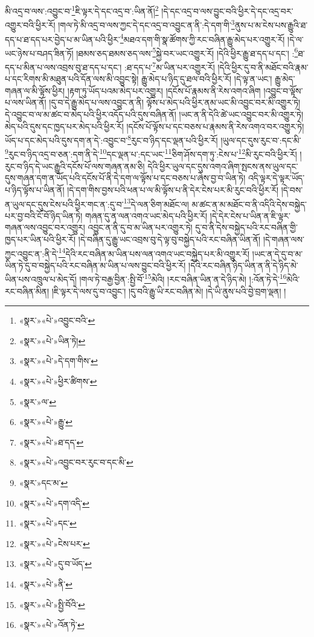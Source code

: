 མི་འདྲ་བ་ལས་:འབྱུང་བ་\footnote{«སྣར་»«པེ་»འབྱུང་བའི་}ཇི་ལྟར་དེ་དང་འདྲ་བ་:ཡིན་ནོ།\footnote{«སྣར་»«པེ་»ཡིན་ཏེ།} །དེ་དང་འདྲ་བ་ལས་བྱུང་བའི་ཕྱིར་དེ་དང་འདྲ་བར་འགྱུར་བའི་ཕྱིར་རོ། །གལ་ཏེ་མི་འདྲ་བ་ལས་ཀྱང་དེ་དང་འདྲ་བ་འབྱུང་ན་ནི་:དེ་དག་གི་\footnote{«སྣར་»«པེ་»དེ་དག་གིས་}ནུས་པ་མ་ངེས་པས་རྒྱུའི་ཐ་དད་པ་ཐ་དད་པར་བྱེད་པ་མ་ཡིན་པའི་ཕྱིར་\footnote{«སྣར་»«པེ་»ཕྱིར་ཚིགས་}མཐའ་དག་གི་སྣ་ཚོགས་ཀྱི་རང་བཞིན་རྒྱུ་མེད་པར་འགྱུར་རོ། །དེ་ལ་ཡང་ཉེས་པ་བཤད་ཟིན་ཏོ། །ཐམས་ཅད་ཐམས་ཅད་ལས་\footnote{«སྣར་»ལ་}སྐྱེ་བར་ཡང་འགྱུར་རོ། །དེའི་ཕྱིར་རྒྱུ་ཐ་དད་པ་དང་། :\footnote{«སྣར་»«པེ་»རྒྱུ་}ཐ་དད་པ་མིན་པ་ལས་འབྲས་བུ་ཐ་དད་པ་དང་། :ཐ་དད་པ་\footnote{«སྣར་»«པེ་»ཐ་དད་}མ་ཡིན་པར་འགྱུར་རོ། །དེའི་ཕྱིར་དུ་བ་ནི་མཐོང་བའི་རྣམ་པ་དང་རིགས་མི་མཐུན་པའི་དོན་ལས་མི་འབྱུང་སྟེ། རྒྱུ་མེད་པ་ཉིད་དུ་ཐལ་བའི་ཕྱིར་རོ། །དེ་ལྟ་ན་ཡང་། རྒྱུ་མེད་གཞན་ལ་མི་ལྟོས་ཕྱིར། །རྟག་ཏུ་ཡོད་པའམ་མེད་པར་འགྱུར། །དངོས་པོ་རྣམས་ནི་རེས་འགའ་ཞིག །འབྱུང་བ་ལྟོས་པ་ལས་ཡིན་ནོ། །དུ་བ་དེ་རྒྱུ་མེད་པ་ལས་འབྱུང་ན་ནི། ལྟོས་པ་མེད་པའི་ཕྱིར་ནམ་ཡང་མི་འབྱུང་བར་མི་འགྱུར་ཏེ། དེ་འབྱུང་བ་ལ་མ་ཚང་བ་མེད་པའི་ཕྱིར་འདོད་པའི་དུས་བཞིན་ནོ། །ཡང་ན་ནི་དེའི་ཚེ་ཡང་འབྱུང་བར་མི་འགྱུར་ཏེ། མེད་པའི་དུས་དང་ཁྱད་པར་མེད་པའི་ཕྱིར་རོ། །དངོས་པོ་ལྟོས་པ་དང་བཅས་པ་རྣམས་ནི་རེས་འགའ་བར་འགྱུར་ཏེ། ཡོད་པ་དང་མེད་པའི་དུས་དག་ན་དེ་:འབྱུང་བ་\footnote{«སྣར་»«པེ་»འབྱུང་བར་རུང་བ་དང་མི་}རུང་བ་ཉིད་དང་ལྡན་པའི་ཕྱིར་རོ། །ཡུལ་དང་དུས་རུང་བ་:དང་མི་\footnote{«སྣར་»དང་མ་}རུང་བ་ཉིད་འདྲ་བ་ཅན་:དག་ནི་དེ་\footnote{«སྣར་»«པེ་»དག་འདི་}དང་ལྡན་པ་:དང་ཡང་\footnote{«སྣར་»«པེ་»དང་}ཅིག་ཤོས་དག་ཏུ་:ངེས་པ་\footnote{«སྣར་»«པེ་»ངེས་པར་}མི་རུང་བའི་ཕྱིར་རོ། །རུང་བ་ཉིད་དེ་ཡང་རྒྱུའི་དངོས་པོ་ལས་གཞན་ནམ་ཅི། དེའི་ཕྱིར་ཡུལ་དང་དུས་འགའ་ཞིག་སྤངས་ནས་ཡུལ་དང་དུས་གཞན་དག་ན་ཡོད་པའི་དངོས་པོ་ནི་དེ་དག་ལ་ལྟོས་པ་དང་བཅས་པ་ཞེས་བྱ་བ་ཡིན་ཏེ། འདི་ལྟར་དེ་ལྟར་ཡོད་པ་ཉིད་ལྟོས་པ་ཡིན་ནོ། །དེ་དག་གིས་བྱས་པའི་ཕན་པ་ལ་མི་ལྟོས་པ་ནི་དེར་ངེས་པར་མི་རུང་བའི་ཕྱིར་རོ། །དེ་བས་ན་ཡུལ་དང་དུས་ངེས་པའི་ཕྱིར་གང་ན་:དུ་བ་\footnote{«སྣར་»«པེ་»དུ་བ་ཡོད་}དེ་ལན་ཅིག་མཐོང་ལ། མ་ཚང་ན་མ་མཐོང་བ་ནི་འདིའི་དེས་བསྐྱེད་པར་བྱ་བའི་ངོ་བོ་ཉིད་ཡིན་ཏེ། གཞན་དུ་ན་ལན་འགའ་ཡང་མེད་པའི་ཕྱིར་རོ། །དེ་དེར་ངེས་པ་ཡིན་ན་ཇི་ལྟར་གཞན་ལས་འབྱུང་བར་འགྱུར། འབྱུང་ན་ནི་དུ་བ་མ་ཡིན་པར་འགྱུར་ཏེ། དུ་བ་ནི་དེས་བསྐྱེད་པའི་རང་བཞིན་གྱི་ཁྱད་པར་ཡིན་པའི་ཕྱིར་རོ། །དེ་བཞིན་དུ་རྒྱུ་ཡང་འབྲས་བུ་དེ་ལྟ་བུ་བསྐྱེད་པའི་རང་བཞིན་ཡིན་ནོ། །དེ་གཞན་ལས་ཀྱང་འབྱུང་ན་:ནི་དེ་\footnote{«སྣར་»«པེ་»ནི་}དེའི་རང་བཞིན་མ་ཡིན་པས་ལན་འགའ་ཡང་བསྐྱེད་པར་མི་འགྱུར་རོ། །ཡང་ན་དེ་དུ་བ་མ་ཡིན་ཏེ་དུ་བ་བསྐྱེད་པའི་རང་བཞིན་མ་ཡིན་པ་ལས་བྱུང་བའི་ཕྱིར་རོ། །དེའི་རང་བཞིན་ཉིད་ཡིན་ན་ནི་དེ་ཉིད་མེ་ཡིན་པས་འཁྲུལ་པ་མེད་དོ། །གལ་ཏེ་བརྒྱ་བྱིན་:སྤྱི་བོ་\footnote{«སྣར་»«པེ་»སྤྱི་བོའི་}མེའི། །རང་བཞིན་ཡིན་ན་དེ་ཉིད་མེ། །:འོན་ཏེ་དེ་\footnote{«སྣར་»«པེ་»འོན་ཏེ་}མེའི་རང་བཞིན་མིན། །ཇི་ལྟར་དེ་ལས་དུ་བ་འབྱུང་། །དུ་བའི་རྒྱུ་ཡི་རང་བཞིན་མེ། །དེ་ཡི་ནུས་པའི་བྱེ་བྲག་ལྡན། །
